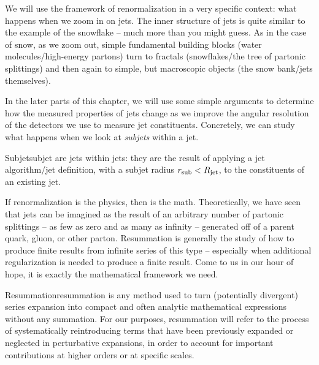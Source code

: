 We will use the framework of renormalization in a very specific context:
%
what happens when we zoom in on jets.
%
The inner structure of jets is quite similar to the example of the snowflake -- much more than you might guess.
%
As in the case of snow, as we zoom out, simple fundamental building blocks (water molecules/high-energy partons) turn to fractals (snowflakes/the tree of partonic splittings) and then again to simple, but macroscopic objects (the snow bank/jets themselves).


In the later parts of this chapter, we will use some simple arguments to determine how the measured properties of jets change as we improve the angular resolution of the detectors we use to measure jet constituents.
%
Concretely, we can study what happens when we look at \textit{subjets} within a jet.
%
\begin{definitionbox}{Subjet}{subjet}
     are jets within jets:
    they are the result of applying a jet algorithm/jet definition, with a subjet radius \(r_\text{sub} < R_\text{jet}\), to the constituents of an existing jet.
\end{definitionbox}





If \gls{renormalization} is the physics, then  is the math.
%
Theoretically, we have seen that jets can be imagined as the result of an arbitrary number of partonic splittings -- as few as zero and as many as infinity -- generated off of a parent quark, gluon, or other parton.
%
Resummation is generally the study of how to produce finite results from infinite series of this type -- especially when additional regularization is needed to produce a finite result.
%
Come to us in our hour of hope, it is exactly the mathematical framework we need.

\begin{definitionbox}{Resummation}{resummation}
     is any method used to turn (potentially divergent) series expansion into compact and often analytic mathematical expressions without any summation.
    For our purposes, resummation will refer to the process of systematically reintroducing terms that have been previously expanded or neglected in perturbative expansions, in order to account for important contributions at higher orders or at specific scales.
\end{definitionbox}



